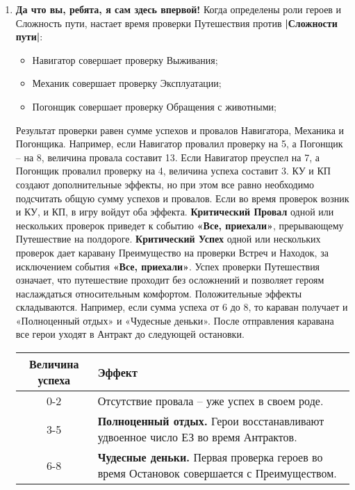 \begin{enumerate}
  \item \textbf{Да что вы, ребята, я сам здесь впервой!} Когда определены роли героев и Сложность пути, настает время проверки Путешествия против \textbf{|Сложности пути|}:
    \begin{itemize}
      \item Навигатор совершает проверку Выживания;
      \item Механик совершает проверку Эксплуатации;
      \item Погонщик совершает проверку Обращения с животными;
    \end{itemize}
    Результат проверки равен сумме успехов и провалов Навигатора, Механика и Погонщика. Например, если Навигатор провалил проверку на 5, а Погонщик – на 8, величина провала составит 13. Если Навигатор преуспел на 7, а Погонщик провалил проверку на 4, величина успеха составит 3.
    \newline КУ и КП создают дополнительные эффекты, но при этом все равно необходимо подсчитать общую сумму успехов и провалов. Если во время проверок возник и КУ, и КП, в игру войдут оба эффекта.
    \newline \textbf{Критический Провал} одной или нескольких проверок приведет к событию \textbf{«Все, приехали»}, прерывающему Путешествие на полдороге.  
    \newline \textbf{Критический Успех} одной или нескольких проверок дает каравану Преимущество на проверки Встреч и Находок, за \newline исключением события \textbf{«Все, приехали»}.
    \newline Успех проверки Путешествия означает, что путешествие проходит без осложнений и позволяет героям наслаждаться относительным комфортом. Положительные эффекты складываются. Например, если сумма успеха от 6 до 8, то караван получает и «Полноценный отдых» и «Чудесные деньки».
    \newline После отправления каравана все герои уходят в Антракт до следующей остановки.
    \begin{center} \begin{tabular}{|c|p{10cm}|} \hline
      \textbf{Величина успеха} & \textbf{Эффект} \\ \hline
      0-2 & Отсутствие провала – уже успех в своем роде. \\ \hline
      3-5 & \textbf{Полноценный отдых.} Герои восстанавливают удвоенное число ЕЗ во время Антрактов. \\ \hline
      6-8 & \textbf{Чудесные деньки.} Первая проверка героев во время Остановок совершается с Преимуществом. \\ \hline

\end{tabular}
\end{center}
\end{enumerate}
